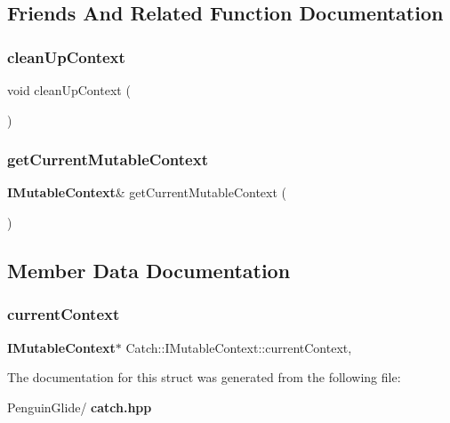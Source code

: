 \subsection{Friends And Related Function Documentation}
\mbox{\label{struct_catch_1_1_i_mutable_context_ac07cdb7d744cc8f09672d924324b55fd}} 
\subsubsection{cleanUpContext}
{\footnotesize\ttfamily void clean\+Up\+Context (\begin{DoxyParamCaption}{ }\end{DoxyParamCaption})\hspace{0.3cm}{\ttfamily [friend]}}

\mbox{\label{struct_catch_1_1_i_mutable_context_aea4b25692aaf4397cdf630716976f6b8}} 
\subsubsection{getCurrentMutableContext}
{\footnotesize\ttfamily \textbf{ I\+Mutable\+Context}\& get\+Current\+Mutable\+Context (\begin{DoxyParamCaption}{ }\end{DoxyParamCaption})\hspace{0.3cm}{\ttfamily [friend]}}



\subsection{Member Data Documentation}
\mbox{\label{struct_catch_1_1_i_mutable_context_aca4de034d0deed74dba34f143e4e273e}} 
\subsubsection{currentContext}
{\footnotesize\ttfamily \textbf{ I\+Mutable\+Context}$\ast$ Catch\+::\+I\+Mutable\+Context\+::current\+Context\hspace{0.3cm}{\ttfamily [static]}, {\ttfamily [private]}}



The documentation for this struct was generated from the following file\+:\begin{DoxyCompactItemize}
\item 
Penguin\+Glide/\textbf{ catch.\+hpp}\end{DoxyCompactItemize}
